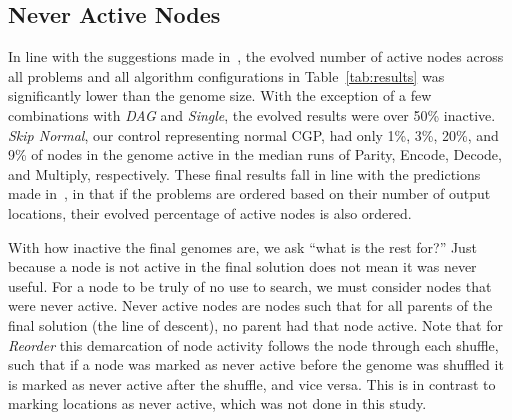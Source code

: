 \documentclass[journal]{IEEEtran}
\begin{document}
\begin{comment}
Using the algorithm given in Figure~\ref{fig:simplify}, we can determine the
absolute minimum set of nodes in a genome's solution that are necessary to
reproduce the original output of that genome.  This allows us to discuss
the usefulness of each node as either being part of the minimum solution, a
duplicate of a node in the minimum solution, or irrelevant to the solution.
As such we can then examine how redundancy is being used, how frequently useful
structures exist in the inactive nodes, and how useful nodes are constructed by evolution.
This algorithm can also be used to construct simplified genomes when combined
with the algorithm given in Figure~\ref{fig:reorder}.
\end{comment}
\subsection{Never Active Nodes}
In line with the suggestions made in~\cite{miller:2006:redundancy}, the evolved
number of active nodes across all problems and all algorithm configurations
in Table~\ref{tab:results}
was significantly lower than the genome size.  With the exception of a few combinations
with \emph{DAG} and \emph{Single}, the evolved results were over 50\% inactive.
\emph{Skip Normal}, our control representing normal CGP, had only 1\%, 3\%, 20\%,
and 9\% of nodes in the genome active in the median runs of Parity, Encode, Decode,
and Multiply, respectively.  These final results fall in line with the predictions
made in~\cite{goldman:2013:ordering}, in that if the problems are ordered based on
their number of output locations, their evolved percentage of active nodes is also ordered.

With how inactive the final genomes are, we ask ``what is the rest for?''
Just because a node is not active in the final solution does not mean it was never
useful.  For a node to be truly of no use to search, we must consider nodes that
were never active.  Never active nodes are nodes such that for all parents of the
final solution (the line of descent), no parent had that node active.  Note that
for \emph{Reorder} this demarcation of node activity follows the node through
each shuffle, such that if a node was marked as never active before the genome
was shuffled it is marked as never active after the shuffle, and vice versa.
This is in contrast to marking locations as never active, which was not done in
this study.
\end{document}

